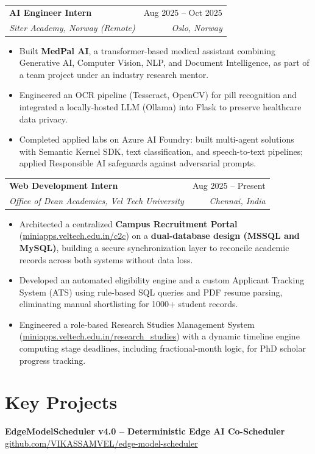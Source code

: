 \documentclass[10pt,a4paper]{article}
\makeatletter
\newcommand{\resumeItem}[1]{\item{\small #1}}
\newcommand{\resumeSubheading}[4]{
\begin{tabular*}{\textwidth}{@{}l@{\extracolsep{\fill}}r@{}}
  \textbf{\small #1} & \small #2 \\
  \textit{\small #3} & \textit{\small #4} \\
\end{tabular*}\vspace{2.5pt}
}
\makeatother
\begin{document}
\resumeSubheading
  {AI Engineer Intern}{Aug 2025 -- Oct 2025}
  {Siter Academy, Norway (Remote)}{Oslo, Norway}
\begin{itemize}
    \resumeItem{Built \textbf{MedPal AI}, a transformer-based medical assistant combining Generative AI, Computer Vision, NLP, and Document Intelligence, as part of a team project under an industry research mentor.}
    \resumeItem{Engineered an OCR pipeline (Tesseract, OpenCV) for pill recognition and integrated a locally-hosted LLM (Ollama) into Flask to preserve healthcare data privacy.}
    \resumeItem{Completed applied labs on Azure AI Foundry: built multi-agent solutions with Semantic Kernel SDK, text classification, and speech-to-text pipelines; applied Responsible AI safeguards against adversarial prompts.}
\end{itemize}

\resumeSubheading
  {Web Development Intern}{Aug 2025 -- Present}
  {Office of Dean Academics, Vel Tech University}{Chennai, India}
\begin{itemize}
    \resumeItem{Architected a centralized \textbf{Campus Recruitment Portal} (\href{https://miniapps.veltech.edu.in/c2c}{miniapps.veltech.edu.in/c2c}) on a \textbf{dual-database design (MSSQL and MySQL)}, building a secure synchronization layer to reconcile academic records across both systems without data loss.}
    \resumeItem{Developed an automated eligibility engine and a custom Applicant Tracking System (ATS) using rule-based SQL queries and PDF resume parsing, eliminating manual shortlisting for 1000+ student records.}
    \resumeItem{Engineered a role-based Research Studies Management System (\href{https://miniapps.veltech.edu.in/research_studies}{miniapps.veltech.edu.in/research\_studies}) with a dynamic timeline engine computing stage deadlines, including fractional-month logic, for PhD scholar progress tracking.}
\end{itemize}

\newpage

\section*{Key Projects}

\small\textbf{EdgeModelScheduler v4.0 -- Deterministic Edge AI Co-Scheduler} \hfill \small\href{https://github.com/VIKASSAMVEL/edge-model-scheduler}{github.com/VIKASSAMVEL/edge-model-scheduler}
\end{document}
